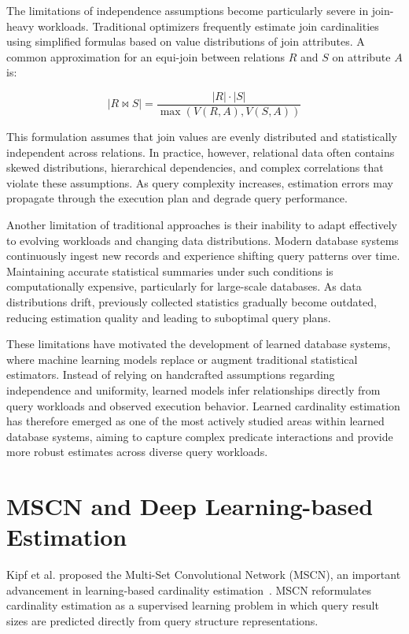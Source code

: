 The limitations of independence assumptions become particularly severe in join-heavy workloads. Traditional optimizers frequently estimate join cardinalities using simplified formulas based on value distributions of join attributes. A common approximation for an equi-join between relations $R$ and $S$ on attribute $A$ is:

\begin{equation}
|R \bowtie S| = \frac{|R| \cdot |S|}{\max(V(R,A),V(S,A))}
\end{equation}

This formulation assumes that join values are evenly distributed and statistically independent across relations. In practice, however, relational data often contains skewed distributions, hierarchical dependencies, and complex correlations that violate these assumptions. As query complexity increases, estimation errors may propagate through the execution plan and degrade query performance.

Another limitation of traditional approaches is their inability to adapt effectively to evolving workloads and changing data distributions. Modern database systems continuously ingest new records and experience shifting query patterns over time. Maintaining accurate statistical summaries under such conditions is computationally expensive, particularly for large-scale databases. As data distributions drift, previously collected statistics gradually become outdated, reducing estimation quality and leading to suboptimal query plans.

These limitations have motivated the development of learned database systems, where machine learning models replace or augment traditional statistical estimators. Instead of relying on handcrafted assumptions regarding independence and uniformity, learned models infer relationships directly from query workloads and observed execution behavior. Learned cardinality estimation has therefore emerged as one of the most actively studied areas within learned database systems, aiming to capture complex predicate interactions and provide more robust estimates across diverse query workloads.

\section{MSCN and Deep Learning-based Estimation}

Kipf et al. proposed the Multi-Set Convolutional Network (MSCN), an important advancement in learning-based cardinality estimation~\cite{DBLP:conf/cidr/KipfKRLBK19}. MSCN reformulates cardinality estimation as a supervised learning problem in which query result sizes are predicted directly from query structure representations.

